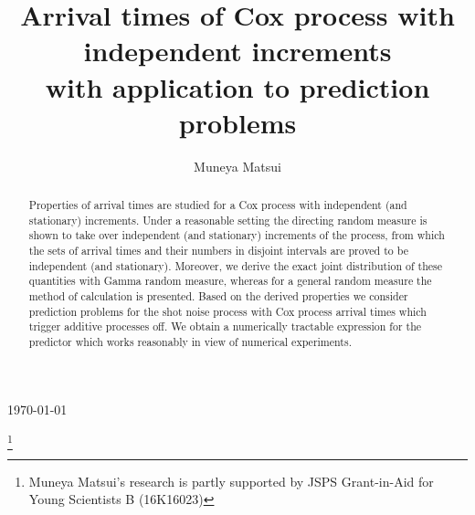 \documentclass[11pt,leqno%
]{amsart}
\newcommand{\1}{{\mathbf 1}}
\begin{document}
\today

\title[Arrival times of Cox process with independent increments]{
Arrival times of Cox process with independent increments \\
with application to prediction problems}
\thanks{Muneya Matsui's research is partly supported by JSPS
Grant-in-Aid for Young Scientists B (16K16023)}
\author[M. Matsui]{Muneya Matsui}
\address{Department of Business Administration, Nanzan University, 18
Yamazato-cho, Showa-ku, Nagoya 466-8673, Japan.}

\begin{abstract}
 Properties of arrival times are studied for a Cox process with 
 independent (and stationary) increments. Under a reasonable
 setting the directing random measure %
 is shown to take over independent (and stationary) increments of the process, 
 from which the sets of arrival times and their numbers in
 disjoint intervals are proved to be independent (and
 stationary). Moreover, we derive the exact joint distribution of these
 quantities with Gamma %
 random measure, whereas for a general 
 random measure the method of calculation is presented. Based on the
 derived properties we consider prediction problems for the shot noise process
 with Cox process arrival times which trigger additive processes off. 
 We obtain a numerically tractable expression for the predictor which works reasonably in
 view of numerical experiments.
\end{abstract}
\maketitle
\end{document}
